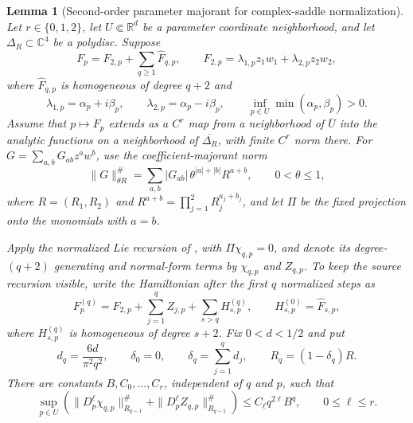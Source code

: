 \documentclass[11pt]{amsart}
\numberwithin{equation}{section}
\newtheorem{lemma}[theorem]{Lemma}
\theoremstyle{definition}
\theoremstyle{remark}
\begin{document}
\begin{lemma}[Second-order parameter majorant for complex-saddle
normalization]
\label{lem:complex-saddle-parameter-majorant}
Let $r\in\{0,1,2\}$, let $U\Subset\mathbb R^d$ be a parameter coordinate
neighborhood, and let
$\Delta_R\subset\mathbb C^4$ be a polydisc.  Suppose
\[
 F_p=F_{2,p}+\sum_{q\ge1}\widehat F_{q,p},\qquad
 F_{2,p}=\lambda_{1,p}z_1w_1+\lambda_{2,p}z_2w_2,
\]
where $\widehat F_{q,p}$ is homogeneous of degree $q+2$ and
\[
 \lambda_{1,p}=\alpha_p+i\beta_p,\qquad
 \lambda_{2,p}=\alpha_p-i\beta_p,\qquad
 \inf_{p\in U}\min(\alpha_p,\beta_p)>0.
\]
Assume that $p\mapsto F_p$ extends as a $C^r$ map from a neighborhood of
$\overline U$ into the analytic functions on a neighborhood of
$\overline{\Delta_R}$, with finite $C^r$ norm there.  For
$G=\sum_{a,b}G_{ab}z^aw^b$, use the coefficient-majorant norm
\begin{equation}\label{eq:parametric-coefficient-majorant-norm}
 \|G\|_{\theta R}^{\#}
 =\sum_{a,b}|G_{ab}|\,\theta^{|a|+|b|}R^{a+b},
 \qquad 0<\theta\le1,
\end{equation}
where $R=(R_1,R_2)$ and
$R^{a+b}=\prod_{j=1}^2R_j^{a_j+b_j}$,
and let $\Pi$ be the fixed projection onto the monomials with $a=b$.

Apply the normalized Lie recursion of
\cite[Sections~2--4]{Giorgilli2001Unstable}, with
$\Pi\chi_{q,p}=0$, and denote its degree-$(q+2)$ generating and
normal-form terms by $\chi_{q,p}$ and $Z_{q,p}$.  To keep the source
recursion visible, write the Hamiltonian after the first $q$ normalized
steps as
\begin{equation}\label{eq:parametric-normal-form-remainders}
 F_p^{(q)}=F_{2,p}+\sum_{j=1}^{q}Z_{j,p}
       +\sum_{s>q}H_{s,p}^{(q)},
 \qquad H_{s,p}^{(0)}=\widehat F_{s,p},
\end{equation}
where $H_{s,p}^{(q)}$ is homogeneous of degree $s+2$.  Fix
$0<d<1/2$ and put
\begin{equation}\label{eq:parametric-majorant-radius-schedule}
 d_q=\frac{6d}{\pi^2q^2},\qquad
 \delta_0=0,\qquad
 \delta_q=\sum_{j=1}^qd_j,\qquad
 R_q=(1-\delta_q)R.
\end{equation}
There are constants $B,C_0,\ldots,C_r$, independent of $q$ and $p$, such
that
\begin{equation}\label{eq:parametric-lie-majorant}
 \sup_{p\in U}\left(
  \|D_p^\ell\chi_{q,p}\|_{R_{q-1}}^{\#}
  +\|D_p^\ell Z_{q,p}\|_{R_{q-1}}^{\#}
 \right)
 \le C_\ell q^{2\ell}B^q,
 \qquad 0\le\ell\le r.
\end{equation}


\end{lemma}
\end{document}
